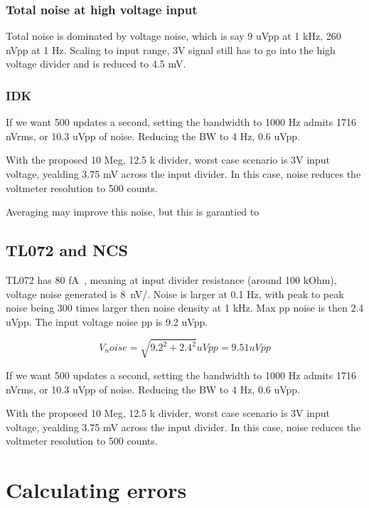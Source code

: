 \documentclass[11pt]{article}
\begin{document}
\subsubsection{Total noise at high voltage input}
Total noise is dominated by voltage noise, which is say 9 uVpp at 1 kHz, 
260 nVpp at 1 Hz. Scaling to input range, 3V signal still has to go into the 
high voltage divider and is reduced to 4.5 mV. 

\subsubsection{IDK}
If we want 500 updates a second, setting the bandwidth to 1000 Hz admits 
1716 nVrms, or 10.3 uVpp of noise.
Reducing the BW to 4 Hz, 0.6 uVpp.

With the proposed 10 Meg, 12.5 k divider, worst case scenario is 3V input voltage,
yealding 3.75 mV across the input divider. In this case, noise reduces the 
voltmeter resolution to 500 counts.


Averaging may improve this noise, but this is garantied to 


\subsection{TL072 and NCS}
TL072 has 80 \si{\femto \ampere \sqrt{\hertz}}, meaning at input divider
resistance (around 100 kOhm), voltage noise generated is \si{8 nV/}. 
Noise is larger at 0.1 Hz, with peak to peak noise being 300 times larger then
noise density at 1 kHz. Max pp noise is then 2.4 uVpp. 
The input voltage noise pp is 9.2 uVpp.

\begin{equation}
  V_noise = \sqrt{ 9.2^2 + 2.4^2} uVpp = 9.51 uVpp
  \label{eq:NCS218xx input noise}
\end{equation}

If we want 500 updates a second, setting the bandwidth to 1000 Hz admits 
1716 nVrms, or 10.3 uVpp of noise.
Reducing the BW to 4 Hz, 0.6 uVpp.

With the proposed 10 Meg, 12.5 k divider, worst case scenario is 3V input voltage,
yealding 3.75 mV across the input divider. In this case, noise reduces the 
voltmeter resolution to 500 counts.

\pagebreak
\section{Calculating errors}
\end{document}
